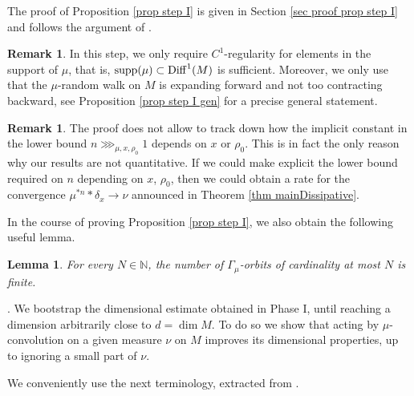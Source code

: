 \documentclass[11pt, leqno, fleqn]{amsart}
\def\cW{\mathcal W}
\def \N{{\mathbb N}}
\newtheorem{lemma}[thm]{\bf Lemma}
\theoremstyle{definition}
\newtheorem{rema}[thm]{\bf Remark}
\theoremstyle{definition}
\def\supp{{\rm supp}}
\def \vol{  {\rm vol} }
\newcommand{\Diff}{{\rm Diff}}
\begin{document}
    The proof of  Proposition \ref{prop step I} is given in Section \ref{sec proof prop step I} and follows the argument of  \cite[Proposition 5.1]{BH1}. 
  
  \begin{rema}
  In this step, we only require $C^1$-regularity for elements in the support of $\mu$, that is, $\supp(\mu) \subset \Diff^1(M)$ is sufficient. Moreover, we only use that the $\mu$-random walk on $M$ is expanding  forward and not too contracting backward, see Proposition \ref{prop step I gen} for a precise general statement. 
  \end{rema}
  
  
  \begin{rema}
  The proof does not allow  to track down how the implicit constant in the lower bound $n \ggg_{\mu, x, \rho_{0}} 1$ depends on $x$ or $\rho_{0}$. This is in fact the only reason why our results are not quantitative. If we could make explicit the lower bound required on $n$ depending on $x$, $\rho_{0}$, then we could obtain a rate for the convergence $\mu^{*n}*\delta_{x} \rightarrow \nu$ announced in Theorem \ref{thm mainDissipative}.
  
  

  \end{rema}

In the course of proving Proposition \ref{prop step I}, we also obtain the following useful lemma.
\begin{lemma}\label{cor countablefiniteorbits}
	 For every $N \in \N$, the number of  $\Gamma_{\mu}$-orbits of cardinality at most $N$ is finite.
\end{lemma}
    
 \bigskip
   
  .  We bootstrap the dimensional estimate obtained in Phase I, until reaching a dimension arbitrarily close to $d=\dim M$. To do so we show that acting by $\mu$-convolution on a given measure $\nu$ on $M$ improves its dimensional properties, up to ignoring a small part of $\nu$.


  
  We conveniently use the next terminology, extracted from \cite[Definition 4.3]{BH1}. 
  
\end{document}
